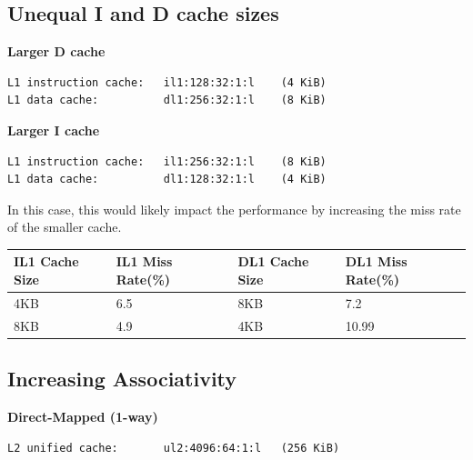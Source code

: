\documentclass[twocolumn]{article}
\begin{document}


\subsection{Unequal I and D cache sizes}

\textbf{Larger D cache}
\begin{lstlisting}
L1 instruction cache:   il1:128:32:1:l    (4 KiB)
L1 data cache:          dl1:256:32:1:l    (8 KiB)
\end{lstlisting}

\textbf{Larger I cache}
\begin{lstlisting}
L1 instruction cache:   il1:256:32:1:l    (8 KiB)
L1 data cache:          dl1:128:32:1:l    (4 KiB)
\end{lstlisting}

In this case, this would likely impact the performance by increasing the miss rate of the smaller cache.\\

\begingroup
    \medskip
    \centering
    \def\arraystretch{1.5}
        \scriptsize{
        \begin{tabular}{llll}
            \toprule
            IL1 Cache Size & IL1 Miss Rate(\%) & DL1 Cache Size  & DL1 Miss Rate(\%)\\
             \midrule
            4KB & 6.5 & 8KB & 7.2\\
            8KB & 4.9 & 4KB & 10.99\\
            \bottomrule
        \end{tabular}
        }
    \label{fig:noOptimization}
    \medskip
\endgroup

\newpage

\subsection{Increasing Associativity}

\textbf{Direct-Mapped (1-way)}
\begin{lstlisting}
L2 unified cache:       ul2:4096:64:1:l   (256 KiB)
\end{lstlisting}
\end{document}
